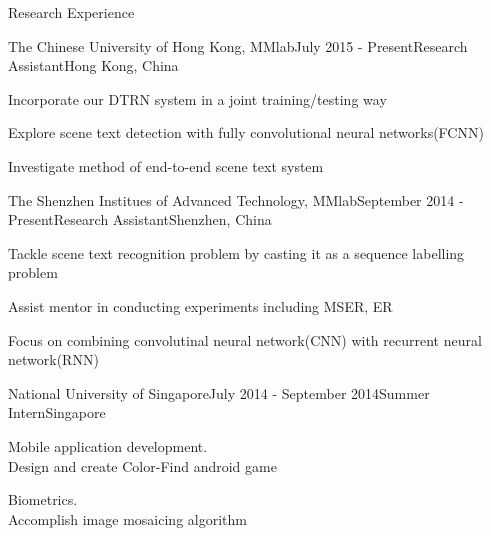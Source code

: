 \documentclass{resume} %
\begin{document}

\begin{rSection}{Research Experience}

\begin{rSubsection}{The Chinese University of Hong Kong, MMlab}{July 2015 - Present}{Research Assistant}{Hong Kong, China}
\item Incorporate our DTRN system in a joint training/testing way
\item Explore scene text detection with fully convolutional neural networks(FCNN)
\item Investigate method of end-to-end scene text system 
\end{rSubsection}


\begin{rSubsection}{The Shenzhen Institues of Advanced Technology, MMlab}{September 2014 - Present}{Research Assistant}{Shenzhen, China}
\item Tackle scene text recognition problem by casting it as a sequence labelling problem
\item Assist mentor in conducting experiments including MSER, ER
\item Focus on combining convolutinal neural network(CNN) with recurrent neural network(RNN)
\end{rSubsection}


\begin{rSubsection}{National University of Singapore}{July 2014 - September 2014}{Summer Intern}{Singapore}
\item Mobile application development.\\
    Design and create Color-Find android game
\item Biometrics. \\
    Accomplish image mosaicing algorithm\\
\end{rSubsection}

\end{rSection}
\end{document}

